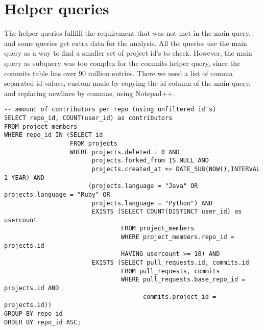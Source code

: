 \documentclass[a4paper,11pt]{article}
\begin{document}
	\section{Helper queries}
	\label{app:helpquery}
	The helper queries fullfill the requirement that was not met in the main query, and some queries get extra data for the analysis. All the queries use the main query as a way to find a smaller set of project id's to check. However, the main query as subquery was too complex for the commits helper query, since the commits table has over 90 million entries. There we used a list of comma separated id values, custom made by copying the id column of the main query, and replacing newlines by commas, using Notepad++.
	
	{\scriptsize
	\begin{verbatim}
-- amount of contributors per repo (using unfiltered id's)
SELECT repo_id, COUNT(user_id) as contributors 
FROM project_members 
WHERE repo_id IN (SELECT id  
                  FROM projects 
                  WHERE projects.deleted = 0 AND 
                        projects.forked_from IS NULL AND 
                        projects.created_at <= DATE_SUB(NOW(),INTERVAL 1 YEAR) AND 
                       (projects.language = "Java" OR projects.language = "Ruby" OR 
                        projects.language = "Python") AND 
                        EXISTS (SELECT COUNT(DISTINCT user_id) as usercount 
                                FROM project_members 
                                WHERE project_members.repo_id = projects.id  
                                HAVING usercount >= 10) AND 
                        EXISTS (SELECT pull_requests.id, commits.id 
                                FROM pull_requests, commits 
                                WHERE pull_requests.base_repo_id = projects.id AND 
                                      commits.project_id = projects.id)) 
GROUP BY repo_id 
ORDER BY repo_id ASC;


\end{verbatim}}
\end{document}
